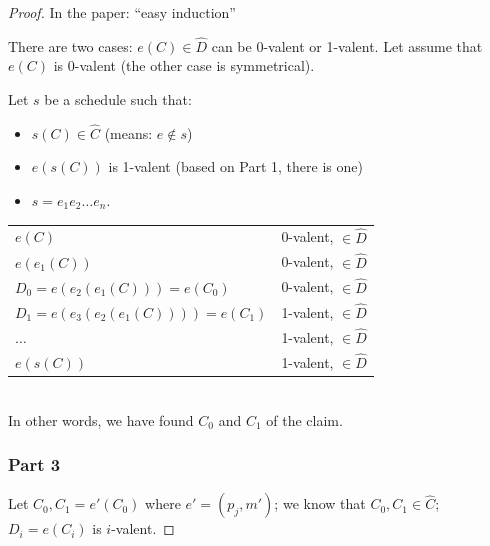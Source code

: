 \documentclass[12pt]{article}
\newcommand{\BI}{\begin{itemize}}
\newcommand{\EI}{\end{itemize}}
\begin{document}
\begin{proof}
In the paper: ``easy induction''

There are two cases: $e(C) \in \hat{D}$ can be 0-valent or 1-valent.
Let assume that $e(C)$ is 0-valent (the other case is symmetrical).

Let $s$ be a schedule such that:
\BI
\item $s(C) \in \hat{C}$ (means: $e \not\in s$)
\item $e(s(C))$ is 1-valent (based on Part 1, there is one)
\item $s=e_1 e_2 \ldots e_n$.
\EI

\begin{tabular}{ll}
$e(C)$					& 0-valent, $\in \hat{D}$ \\
$e(e_1(C))$				& 0-valent, $\in \hat{D}$ \\
$D_0=e(e_2(e_1(C))) = e(C_0)$		& 0-valent, $\in \hat{D}$ \\
$D_1=e(e_3(e_2(e_1(C)))) = e(C_1)$	& 1-valent, $\in \hat{D}$ \\
$\ldots$				& 1-valent, $\in \hat{D}$ \\
$e(s(C))$				& 1-valent, $\in \hat{D}$ \\
\end{tabular}
~\\

In other words, we have found $C_0$ and $C_1$ of the claim.

\newpage
\subsubsection*{Part 3}

Let $C_0, C_1=e'(C_0)$ where $e'=(p_j,m')$; we know that
$C_0, C_1 \in \hat{C}$; $D_i = e(C_i)$ is $i$-valent.


\end{proof}
\end{document}
